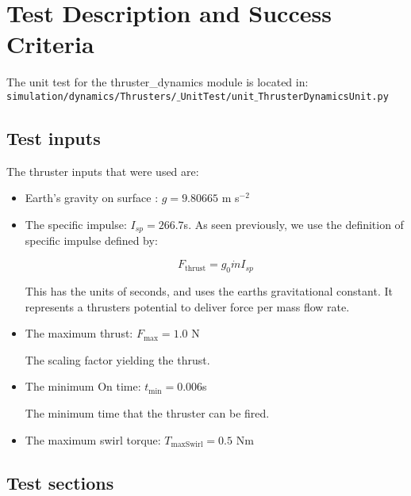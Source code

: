 \section{Test Description and Success Criteria}

The unit test for the thruster\_dynamics module is located in:\\

\noindent
{\tt simulation/dynamics/Thrusters/$\_$UnitTest/unit$\_$ThrusterDynamicsUnit.py} \\

\subsection{Test inputs}

The thruster inputs that were used are:

\begin{itemize}
\item Earth's gravity on surface : $g=9.80665$ m s$^{-2}$
\item The specific impulse: $I_{sp} = 266.7$s. As seen previously, we use the definition of specific impulse defined by:

\begin{equation*}
F_{\mathrm{thrust}} = g_0 \dot{m} I_{sp}
\end{equation*}

This has the units of seconds, and uses the earths gravitational constant. It represents a thrusters potential to deliver force per mass flow rate.
\item The maximum thrust: $F_{\mathrm{max}} = 1.0$ N

The scaling factor yielding the thrust.
\item The minimum On time: $t_{\mathrm{min}} = 0.006$s

The minimum time that the thruster can be fired.

\item The maximum swirl torque: $T_{\mathrm{maxSwirl}} = 0.5$ Nm
\end{itemize}

\subsection{Test sections}

